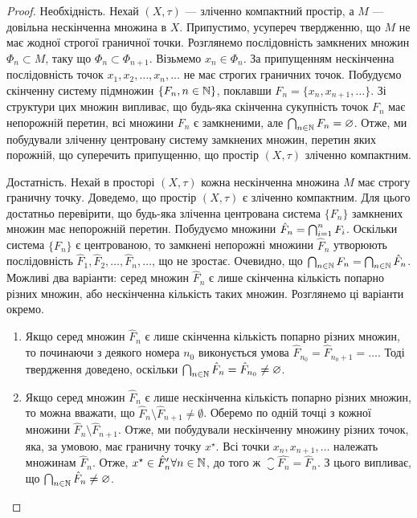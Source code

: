 \begin{proof}
Необхідність. Нехай $(X, \tau)$ --- зліченно
компактний простір, а $M$ --- довільна нескінченна множина
в $X$. Припустимо, усупереч твердженню, що $M$ не має
жодної строгої граничної точки. Розглянемо послідовність
замкнених множин $\Phi_n \subset M$, таку що $\Phi_n \subset \Phi_{n + 1}$.
Візьмемо $x_n \in \Phi_n$.
За припущенням нескінченна послідовність точок
$x_1, x_2, \dots, x_n, \dots$ не має строгих граничних точок. Побудуємо
скінченну систему підмножин $\{F_n, n \in \mathbb{N}\}$, поклавши
$F_n = \{x_n, x_{n+1}, \dots\}$. Зі структури цих множин випливає, що
будь-яка скінченна сукупність точок $F_n$ має непорожній
перетин, всі множини $F_n$ є замкненими,
але $\operatorname*{\bigcap}_{n \in \mathbb{N}} F_n = \varnothing$.
Отже, ми побудували зліченну центровану систему
замкнених множин, перетин яких порожній, що суперечить
припущенню, що простір $(X, \tau)$ зліченно компактним.

Достатність. Нехай в просторі $(X, \tau)$ кожна
нескінченна множина $M$ має строгу граничну точку.
Доведемо, що простір $(X, \tau)$ є зліченно компактним. Для
цього достатньо перевірити, що будь-яка зліченна
центрована система $\{F_n\}$ замкнених множин має
непорожній перетин. Побудуємо множини
$\hat F_n = \operatorname*{\bigcap}_{i = 1}^n F_i$.
Оскільки система $\{F_n\}$ є центрованою, то замкнені
непорожні множини $\hat F_n$ утворюють послідовність
$\hat F_1, \hat F_2, \dots, \hat F_n, \dots$, що не зростає.
Очевидно, що $\operatorname*{\bigcap}_{n \in \mathbb{N}} F_n = \operatorname*{\bigcap}_{n \in \mathbb{N}} \hat F_n$.
Можливі два варіанти: серед множин $\hat F_n$ є лише скінченна
кількість попарно різних множин, або нескінченна кількість
таких множин. Розглянемо ці варіанти окремо.
\begin{enumerate}
\item Якщо серед множин $\hat F_n$ є лише скінченна кількість
попарно різних множин, то починаючи з деякого номера $n_0$
виконується умова $\hat F_{n_0} = \hat F_{n_0 + 1} = \dots$.
Тоді твердження доведено, оскільки $\operatorname*{\bigcap}_{n \in \mathbb{N}} \hat F_n = \hat F_{n_0} \ne \varnothing$.

\item Якщо серед множин $\hat F_n$
є лише нескінченна кількість
попарно різних множин, то можна вважати, що
$\hat F_n \setminus \hat F_{n + 1} \ne \emptyset$.
Оберемо по одній точці з кожної множини
$\hat F_n \setminus \hat F_{n + 1}$.
Отже, ми побудували нескінченну множину різних
точок, яка, за умовою, має граничну точку $x^\star$. Всі точки
$x_n, x_{n + 1}, \dots$ належать множинам $\hat F_n$. Отже,
$x^\star \in \hat F_n' \forall n \in \mathbb{N}$,
до того ж $\closure{\hat{F_n}} = \hat F_n$.
З цього випливає, що $\operatorname*{\bigcap}_{n \in \mathbb{N}} \hat F_n \ne \varnothing$. \qedhere
\end{enumerate}
\end{proof}

